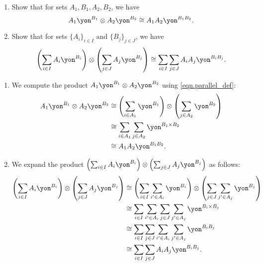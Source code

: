 \documentclass[Book-Poly]{subfiles}
\begin{document}
\begin{exercise} \label{exc.general_poly_parallel_times}
\begin{enumerate}
    \item \label{exc.general_poly_parallel_times.monomial} Show that for sets $A_1, B_1, A_2, B_2$, we have
    \[
        A_1\yon^{B_1} \otimes A_2\yon^{B_2} \iso A_1 A_2\yon^{B_1 B_2}.
    \]
    \item \label{exc.general_poly_parallel_times.polynomial} Show that for sets $\{A_i\}_{i \in I}$ and $\{B_j\}_{j \in J}$, we have
    \[
        \left(\sum_{i \in I} A_i\yon^{B_i}\right) \otimes \left(\sum_{j \in J} A_j\yon^{B_j}\right) \iso \sum_{i \in I} \sum_{j \in J} A_i A_j \yon^{B_i B_j}.
    \]
\end{enumerate}
\begin{solution}
\begin{enumerate}
    \item We compute the product $A_1\yon^{B_1} \otimes A_2\yon^{B_2}$ using \eqref{eqn.parallel_def}:
    \begin{align*}
        A_1\yon^{B_1} \otimes A_2\yon^{B_2} &\iso \left(\sum_{i \in A_1} \yon^{B_1}\right) \otimes \left(\sum_{j \in A_2} \yon^{B_2}\right) \\
        &\iso \sum_{i \in A_1} \sum_{j \in A_2} \yon^{B_1 \times B_2} \\
        &\iso A_1 A_2\yon^{B_1 B_2}.
    \end{align*}

    \item We expand the product $\left(\sum_{i \in I} A_i\yon^{B_i}\right) \otimes \left(\sum_{j \in J} A_j\yon^{B_j}\right)$ as follows:
    \begin{align*}
        \left(\sum_{i \in I} A_i\yon^{B_i}\right) \otimes \left(\sum_{j \in J} A_j\yon^{B_j}\right) &\iso \left(\sum_{i \in I} \sum_{i' \in A_i} \yon^{B_i}\right) \otimes \left(\sum_{j \in J} \sum_{j' \in A_j} \yon^{B_j}\right) \\
        &\iso \sum_{i \in I} \sum_{i' \in A_i} \sum_{j \in J} \sum_{j' \in A_j} \yon^{B_i \times B_j} \\
        &\iso \sum_{i \in I} \sum_{j \in J} \sum_{i' \in A_i} \sum_{j' \in A_j} \yon^{B_i B_j} \\
        &\iso \sum_{i \in I} \sum_{j \in J} A_i A_j \yon^{B_i B_j}.
    \end{align*}
\end{enumerate}
\end{solution}
\end{exercise}
\end{document}
